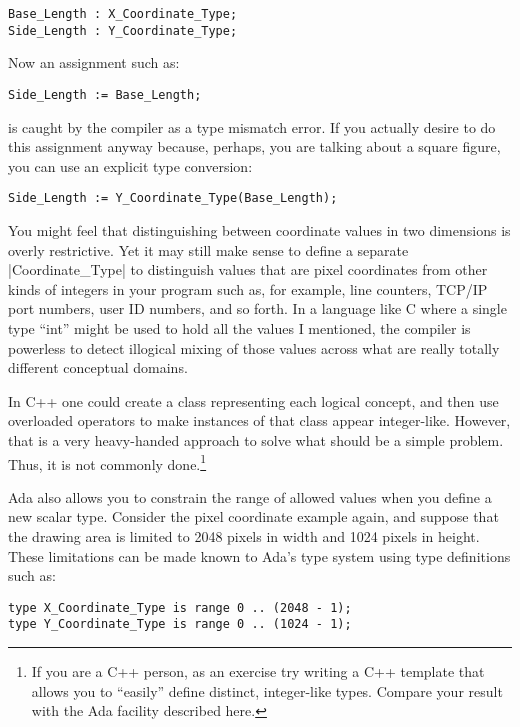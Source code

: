 \begin{lstlisting}
Base_Length : X_Coordinate_Type;
Side_Length : Y_Coordinate_Type;
\end{lstlisting}

\noindent Now an assignment such as:

\begin{lstlisting}
Side_Length := Base_Length;
\end{lstlisting}

\noindent is caught by the compiler as a type mismatch error. If you actually desire to do this
assignment anyway because, perhaps, you are talking about a square figure, you can use an
explicit type conversion:

\begin{lstlisting}
Side_Length := Y_Coordinate_Type(Base_Length);
\end{lstlisting}

You might feel that distinguishing between coordinate values in two dimensions is overly
restrictive. Yet it may still make sense to define a separate |Coordinate_Type| to distinguish
values that are pixel coordinates from other kinds of integers in your program such as, for
example, line counters, TCP/IP port numbers, user ID numbers, and so forth. In a language like C
where a single type ``int'' might be used to hold all the values I mentioned, the compiler is
powerless to detect illogical mixing of those values across what are really totally different
conceptual domains.

In C++ one could create a class representing each logical concept, and then use overloaded
operators to make instances of that class appear integer-like. However, that is a very
heavy-handed approach to solve what should be a simple problem. Thus, it is not commonly
done.\footnote{If you are a C++ person, as an exercise try writing a C++ template that allows
  you to ``easily'' define distinct, integer-like types. Compare your result with the Ada
  facility described here.}

Ada also allows you to constrain the range of allowed values when you define a new scalar type.
Consider the pixel coordinate example again, and suppose that the drawing area is limited to
2048 pixels in width and 1024 pixels in height. These limitations can be made known to Ada's
type system using type definitions such as:

\begin{lstlisting}
type X_Coordinate_Type is range 0 .. (2048 - 1);
type Y_Coordinate_Type is range 0 .. (1024 - 1);
\end{lstlisting}

